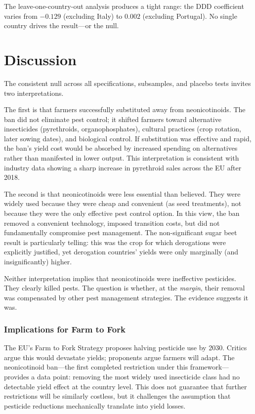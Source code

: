 \documentclass[12pt]{article}
\begin{document}
The leave-one-country-out analysis produces a tight range: the DDD coefficient varies from $-0.129$ (excluding Italy) to $0.002$ (excluding Portugal). No single country drives the result---or the null.

\section{Discussion}

The consistent null across all specifications, subsamples, and placebo tests invites two interpretations.

The first is that farmers successfully substituted away from neonicotinoids. The ban did not eliminate pest control; it shifted farmers toward alternative insecticides (pyrethroids, organophosphates), cultural practices (crop rotation, later sowing dates), and biological control. If substitution was effective and rapid, the ban's yield cost would be absorbed by increased spending on alternatives rather than manifested in lower output. This interpretation is consistent with industry data showing a sharp increase in pyrethroid sales across the EU after 2018.

The second is that neonicotinoids were less essential than believed. They were widely used because they were cheap and convenient (as seed treatments), not because they were the only effective pest control option. In this view, the ban removed a convenient technology, imposed transition costs, but did not fundamentally compromise pest management. The non-significant sugar beet result is particularly telling: this was the crop for which derogations were explicitly justified, yet derogation countries' yields were only marginally (and insignificantly) higher.

Neither interpretation implies that neonicotinoids were ineffective pesticides. They clearly killed pests. The question is whether, at the \textit{margin}, their removal was compensated by other pest management strategies. The evidence suggests it was.

\subsubsection*{Implications for Farm to Fork} The EU's Farm to Fork Strategy proposes halving pesticide use by 2030. Critics argue this would devastate yields; proponents argue farmers will adapt. The neonicotinoid ban---the first completed restriction under this framework---provides a data point: removing the most widely used insecticide class had no detectable yield effect at the country level. This does not guarantee that further restrictions will be similarly costless, but it challenges the assumption that pesticide reductions mechanically translate into yield losses.
\end{document}
